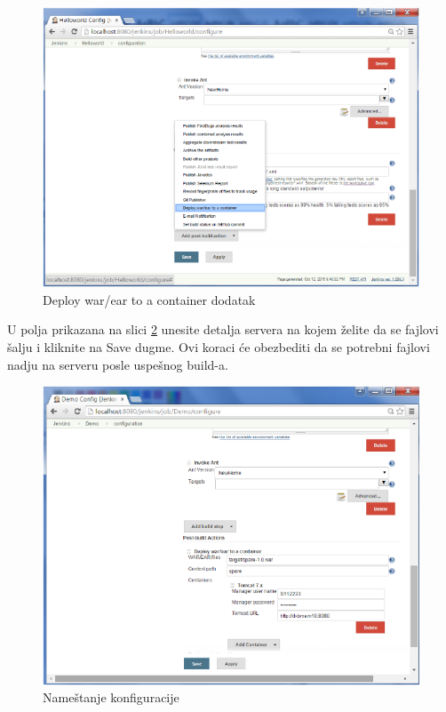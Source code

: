 \begin{figure}
\begin{center}
\includegraphics[scale=0.45]{slike/deploy_war_ear_container.png}
\end{center}
\caption{Deploy war/ear to a container dodatak}
\label{fig:deploy_war_ear_container}
\end{figure}

U polja prikazana na slici \ref{fig:demo_config.png} unesite detalja servera na kojem želite da se fajlovi šalju i kliknite na Save dugme. Ovi koraci će obezbediti da se potrebni fajlovi nadju na serveru posle uspešnog build-a.

\begin{figure}
\begin{center}
\includegraphics[scale=0.45]{slike/demo_config.png}
\end{center}
\caption{Nameštanje konfiguracije}
\label{fig:demo_config.png}
\end{figure}



